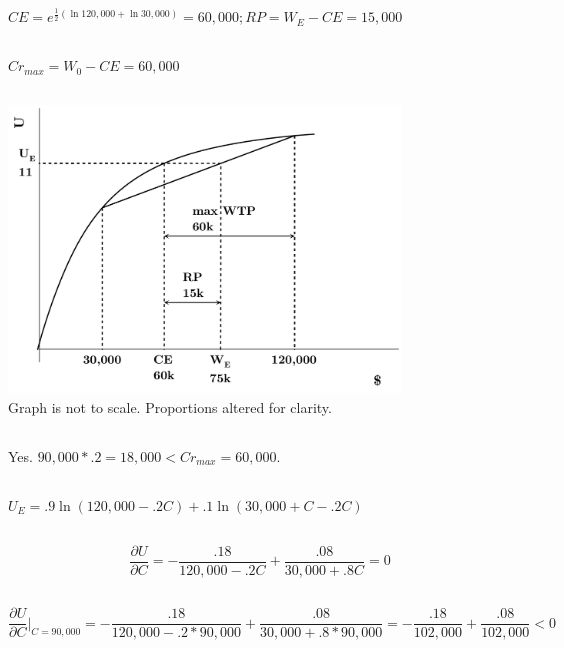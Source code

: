 \documentclass{article}
\begin{document}
	\subsection[c]{}
		$ CE = e^{\frac{1}{2} (\ln 120,000 + \ln 30,000)} = 60,000; RP = W_E - CE = 15,000 $
	\subsection[d]{}
		$ {Cr}_{max} = W_0 - CE  = 60,000 $
	\subsection[e]{}
		\includegraphics[height=3in]{Charts/5e}
		 \\Graph is not to scale. Proportions altered for clarity. 
	\subsection[f]{}
		Yes. $ 90,000*.2 = 18,000 < {Cr}_{max} = 60,000.$
	\subsection[g]{}
		$ U_E = .9 \ln (120,000 - .2C) + .1 \ln (30,000 + C - .2C) $
	\subsection[h]{}
		$$
			\frac{\partial U}{\partial C} = -\frac{.18}{120,000 - .2C} + \frac{.08}{30,000 + .8C} = 0
		$$
	\subsection[i]{}
		$$
			\frac{\partial U}{\partial C} \bigg |_{C=90,000} = -\frac{.18}{120,000 - .2*90,000} + \frac{.08}{30,000 + .8*90,000} = -\frac{.18}{102,000}+\frac{.08}{102,000} < 0
		$$
\end{document}
